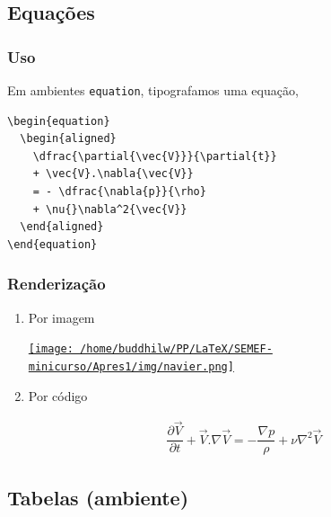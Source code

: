 \documentclass[11pt]{article}
\begin{document}
\subsection{Equações}
\label{sec:orgb22f5c0}
\subsubsection{Uso}
\label{sec:orgb4df39a}
Em ambientes \texttt{equation}, tipografamos uma equação,
\begin{verbatim}
\begin{equation}
  \begin{aligned}
    \dfrac{\partial{\vec{V}}}{\partial{t}}
    + \vec{V}.\nabla{\vec{V}}
    = - \dfrac{\nabla{p}}{\rho}
    + \nu{}\nabla^2{\vec{V}}
  \end{aligned}
\end{equation}
\end{verbatim}

\subsubsection{Renderização}
\label{sec:org2ef9fe4}

\begin{enumerate}
\item Por imagem
\label{sec:orgd5ef9b9}

\href{img/navier.png}{\texttt{[image: /home/buddhilw/PP/LaTeX/SEMEF-minicurso/Apres1/img/navier.png]}}

\item Por código
\label{sec:orgbe83253}

\begin{equation}
  \begin{aligned}
    \dfrac{\partial{\vec{V}}}{\partial{t}}
    + \vec{V}.\nabla{\vec{V}}
    = - \dfrac{\nabla{p}}{\rho}
    + \nu{}\nabla^2{\vec{V}}
  \end{aligned}
\end{equation}
\end{enumerate}
\subsection{Tabelas (ambiente)}
\label{sec:org3c37492}
\end{document}
